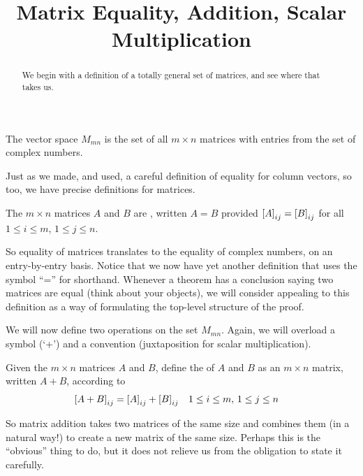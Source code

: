 \documentclass{ximera}
\title{Matrix Equality, Addition, Scalar Multiplication}
\begin{document}
\begin{abstract}
  We begin with a definition of a totally general set of matrices, and see where that takes us.
\end{abstract}
\maketitle

\begin{definition}
  The vector space $M_{mn}$ is the set of all $m\times n$ matrices with entries from the set of complex numbers.
\end{definition}

Just as we made, and used, a careful definition of equality for column
vectors, so too, we have precise definitions for matrices.

\begin{definition}
  The $m\times n$ matrices $A$ and $B$ are , written $A=B$
  provided $\left\lbrack A\right\rbrack_{ij}=\left\lbrack B\right\rbrack_{ij}$ for all
  $1\leq i\leq m$, $1\leq j\leq n$.
\end{definition}

So equality of matrices translates to the equality of complex numbers,
on an entry-by-entry basis.  Notice that we now have yet another
definition that uses the symbol ``='' for shorthand.  Whenever a
theorem has a conclusion saying two matrices are equal (think about
your objects), we will consider appealing to this definition as a way
of formulating the top-level structure of the proof.

We will now define two operations on the set $M_{mn}$.  Again, we will
overload a symbol (`+') and a convention (juxtaposition for scalar
multiplication).

\begin{definition}
  Given the $m\times n$ matrices $A$ and $B$, define the  of
  $A$ and $B$ as an $m\times n$ matrix, written $A+B$, according to
  \begin{align*}
    \left\lbrack A+B\right\rbrack_{ij}&=\left\lbrack A\right\rbrack_{ij}+\left\lbrack B\right\rbrack_{ij}
    &&1\leq i\leq m,\,1\leq j\leq n
  \end{align*}
\end{definition}

So matrix addition takes two matrices of the same size and combines
them (in a natural way!) to create a new matrix of the same size.
Perhaps this is the ``obvious'' thing to do, but it does not relieve
us from the obligation to state it carefully.
\end{document}
